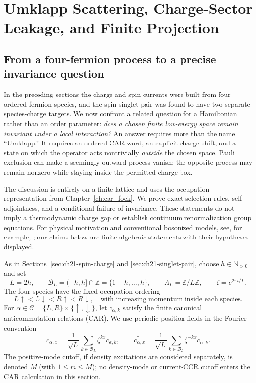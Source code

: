 \section{Umklapp Scattering, Charge-Sector Leakage, and Finite Projection}
\label{sec:ch21-umklapp}

\subsection*{From a four-fermion process to a precise invariance question}

In the preceding sections the charge and spin currents were built from four
ordered fermion species, and the spin-singlet pair was found to have two
separate species-charge targets.  We now confront a related question for a
Hamiltonian rather than an order parameter: \emph{does a chosen finite
low-energy space remain invariant under a local interaction?}  An answer
requires more than the name ``Umklapp.''  It requires an ordered CAR word,
an explicit charge shift, and a state on which the operator acts nontrivially
\emph{outside} the chosen space.  Pauli exclusion can make a seemingly
outward process vanish; the opposite process may remain nonzero while staying
inside the permitted charge box.

The discussion is entirely on a finite lattice and uses the occupation
representation from Chapter~\ref{ch:car_fock}.  We prove exact selection rules,
self-adjointness, and a conditional failure of invariance.  These statements
do not imply a thermodynamic charge gap or establish continuum renormalization
group equations.  For physical motivation and conventional bosonized models,
see, for example, \cite{giamarchi2004,gogolin1998}; our claims below are
finite algebraic statements with their hypotheses displayed.

As in Sections~\ref{sec:ch21-spin-charge} and
\ref{sec:ch21-singlet-pair}, choose \(h\in\mathbb N_{>0}\) and set
\begin{equation}
  L=2h,\qquad \mathcal B_L=(-h,h]\cap\mathbb Z
       =\{1-h,\ldots,h\},\qquad
  \Lambda_L=\mathbb Z/L\mathbb Z,\qquad \zeta=e^{2\pi i/L}.
  \label{eq:ch21-u-band}
\end{equation}
The four species have the fixed occupation ordering
\begin{equation}
 L\uparrow<L\downarrow<R\uparrow<R\downarrow,
 \quad\text{with increasing momentum inside each species}.
 \label{eq:ch21-u-order}
\end{equation}
For \(\alpha\in\mathcal C=\{L,R\}\times\{\uparrow,\downarrow\}\),
let \(c_{\alpha,k}\) satisfy the finite canonical anticommutation relations
(CAR).  We use periodic position fields in the Fourier convention
\begin{equation}
 c_{\alpha,x}=\frac1{\sqrt L}\sum_{k\in\mathcal B_L}
                \zeta^{kx}c_{\alpha,k},\qquad
 c_{\alpha,x}^{\dagger}=\frac1{\sqrt L}\sum_{k\in\mathcal B_L}
                \zeta^{-kx}c_{\alpha,k}^{\dagger}.
 \label{eq:ch21-u-site-fields}
\end{equation}
The positive-mode cutoff, if density excitations are considered separately,
is denoted \(M\) (with \(1\leq m\leq M\)); no density-mode or
current-CCR cutoff enters the CAR calculation in this section.

